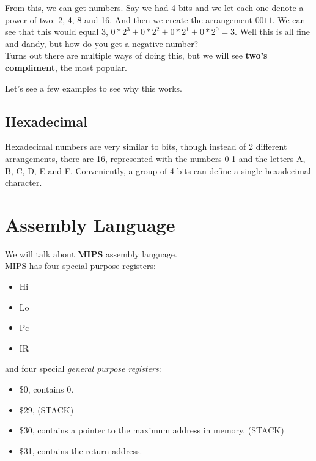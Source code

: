 \documentclass[12pt, twoside]{article}
\begin{document}
From this, we can get numbers.  Say we had 4 bits and we let each one denote a power of two: 2, 4, 8 and 16.  And then we create the arrangement $0011$.  We can see that this would equal 3, $0 * 2^3 + 0 * 2^2 + 0 * 2^1 + 0 * 2^0 = 3$.  Well this is all fine and dandy, but how do you get a negative number? \\
 
Turns out there are multiple ways of doing this, but we will see \textbf{two's compliment}, the most popular.

 
Let's see a few examples to see why this works. \\


\subsection{Hexadecimal}
Hexadecimal numbers are very similar to bits, though instead of 2 different arrangements, there are 16, represented with the numbers 0-1 and the letters A, B, C, D, E and F.  Conveniently, a group of 4 bits can define a single hexadecimal character. \\

\section{Assembly Language}

We will talk about \textbf{MIPS} assembly language. \\

MIPS has four special purpose registers:
\begin{itemize}
\item Hi
\item Lo
\item Pc
\item IR
\end{itemize}
and four special \emph{general purpose registers}:
\begin{itemize}
\item \$0, contains 0. 
\item \$29, (STACK)
\item \$30, contains a pointer to the maximum address in memory. (STACK)
\item \$31, contains the return address.  
\end{itemize}
\end{document}
